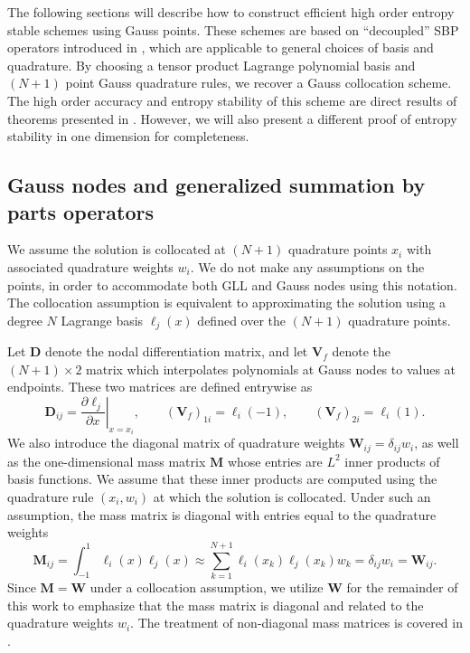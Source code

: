 \documentclass[review,onefignum,onetabnum,final]{siamart171218}
\newcommand{\pd}[2]{\frac{\partial#1}{\partial#2}}
\newcommand{\LRp}[1]{\left( #1 \right)}
\newcommand{\LRl}[1]{\left. #1 \right|}
\begin{document}
The following sections will describe how to construct efficient high order entropy stable schemes using Gauss points.  These schemes are based on ``decoupled'' SBP operators introduced in \cite{chan2017discretely, chan2018discretely}, which are applicable to general choices of basis and quadrature.  By choosing a tensor product Lagrange polynomial basis and $(N+1)$ point Gauss quadrature rules, we recover a Gauss collocation scheme.  The high order accuracy and entropy stability of this scheme are direct results of theorems presented in  \cite{chan2017discretely, chan2018discretely}.  However, we will also present a different proof of entropy stability in one dimension for completeness.  

\subsection{Gauss nodes and generalized summation by parts operators}
\label{sec:gsbp}
We assume the solution is collocated at $(N+1)$ quadrature points $x_i$ with associated quadrature weights $w_i$.  We do not make any assumptions on the points, in order to accommodate both GLL and Gauss nodes using this notation.  The collocation assumption is equivalent to approximating the solution using a degree $N$ Lagrange basis $\ell_j(x)$ defined over the $(N+1)$ quadrature points.  

Let $\bm{D}$ denote the nodal differentiation matrix, and let $\bm{V}_f$ denote the $(N+1)\times 2$ matrix which interpolates polynomials at Gauss nodes to values at endpoints.  These two matrices are defined entrywise as
\[
\bm{D}_{ij} = \LRl{\pd{\ell_j}{x}}_{x = x_i}, \qquad \LRp{\bm{V}_f}_{1i} = \ell_i(-1), \qquad  \LRp{\bm{V}_f}_{2i} = \ell_i(1).
\]
We also introduce the diagonal matrix of quadrature weights $\bm{W}_{ij} = \delta_{ij} w_i$, as well as the one-dimensional mass matrix $\bm{M}$ whose entries are $L^2$ inner products of basis functions.  We assume that these inner products are computed using the quadrature rule $(x_i, w_i)$ at which the solution is collocated.  Under such an assumption, the mass matrix is diagonal with entries equal to the quadrature weights
\[
\bm{M}_{ij} = \int_{-1}^1 \ell_i(x)\ell_j(x) \approx \sum_{k=1}^{N+1} \ell_i(x_k)\ell_j(x_k) w_k = \delta_{ij} w_i = \bm{W}_{ij}.
\]
Since $\bm{M} = \bm{W}$ under a collocation assumption, we utilize $\bm{W}$ for the remainder of this work to emphasize that the mass matrix is diagonal and related to the quadrature weights $w_i$.  The treatment of non-diagonal mass matrices is covered in \cite{chan2017discretely, chan2018discretely}.
\end{document}
